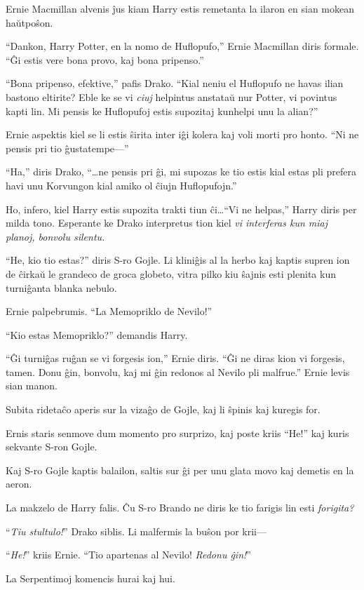 Ernie Macmillan alvenis ĵus kiam Harry estis remetanta la ilaron en
sian mokean haŭtpoŝon.

``Dankon, Harry Potter, en la nomo de Huflopufo,'' Ernie Macmillan
diris formale. ``Ĝi estis vere bona provo, kaj bona pripenso.''

``Bona pripenso, efektive,'' pafis Drako. ``Kial neniu el Huflopufo ne
havas ilian bastono eltirite? Eble ke se vi \emph{ciuj} helpintus
anstataŭ nur Potter, vi povintus kapti lin. Mi pensis ke Huflopufoj
estis supozitaj kunhelpi unu la alian?''

Ernie aspektis kiel se li estis ŝirita inter iĝi kolera kaj voli
morti pro honto. ``Ni ne pensis pri tio ĝustatempe—''

``Ha,'' diris Drako, ``\ldots ne pensis pri ĝi, mi supozas ke tio estis kial
estas pli prefera havi unu Korvungon kial amiko ol ĉiujn Huflopufojn.''

Ho, infero, kiel Harry estis supozita trakti tiun ĉi\ldots ``Vi ne
helpas,'' Harry diris per milda tono. Esperante ke Drako interpretus
tion kiel \emph{vi interferas kun miaj planoj, bonvolu silentu.}

``He, kio tio estas?'' diris S-ro Gojle. Li kliniĝis al la herbo kaj
kaptis supren ion de ĉirkaŭ le grandeco de groca globeto, vitra pilko
kiu ŝajnis esti plenita kun turniĝanta blanka nebulo.

Ernie palpebrumis. ``La Memopriklo de Nevilo!''

``Kio estas Memopriklo?'' demandis Harry.

``Ĝi turniĝas ruĝan se vi forgesis ion,'' Ernie diris. ``Ĝi ne diras
kion vi forgesis, tamen. Donu ĝin, bonvolu, kaj mi ĝin redonos al
Nevilo pli malfrue.'' Ernie levis sian manon.

Subita ridetaĉo aperis sur la vizaĝo de Gojle, kaj li ŝpinis kaj kuregis for.

Ernis staris senmove dum momento pro surprizo, kaj poste kriis ``He!''
kaj kuris sekvante S-ron Gojle.

Kaj S-ro Gojle kaptis balailon, saltis sur ĝi per unu glata movo kaj
demetis en la aeron.

La makzelo de Harry falis. Ĉu S-ro Brando ne diris ke tio farigis lin
esti \emph{forigita?}

``\emph{Tiu stultulo!}'' Drako siblis. Li malfermis la buŝon por krii—

``\emph{He!}'' kriis Ernie. ``Tio apartenas al Nevilo! \emph{Redonu ĝin!}''

La Serpentimoj komencis hurai kaj hui.

